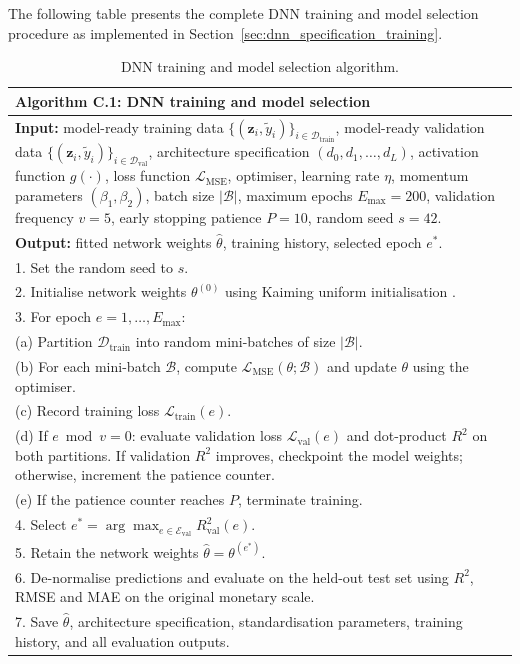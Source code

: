 The following table presents the complete DNN training and model
selection procedure as implemented in
Section~\ref{sec:dnn_specification_training}.

\begin{table}[H]
\centering
{\small
\renewcommand{\arraystretch}{1.15}
\begin{tabular}{p{}}
\toprule
\textbf{Algorithm C.1: DNN training and model selection} \\
\midrule
\textbf{Input:} model-ready training data
$\{(\mathbf{z}_i, \widetilde{y}_i)\}_{i \in \mathcal{D}_{\mathrm{train}}}$,
model-ready validation data
$\{(\mathbf{z}_i, \widetilde{y}_i)\}_{i \in \mathcal{D}_{\mathrm{val}}}$,
architecture specification $(d_0, d_1, \ldots, d_L)$,
activation function $g(\cdot)$, loss function $\mathcal{L}_{\mathrm{MSE}}$,
optimiser, learning rate $\eta$, momentum parameters $(\beta_1,\beta_2)$,
batch size $|\mathcal{B}|$,
maximum epochs $E_{\max} = 200$, validation frequency $v = 5$,
early stopping patience $P = 10$, random seed $s = 42$. \\[3pt]

\textbf{Output:} fitted network weights $\widehat{\theta}$,
training history, selected epoch $e^{*}$. \\[3pt]

1. Set the random seed to $s$. \\
2. Initialise network weights $\theta^{(0)}$ using Kaiming uniform
   initialisation \citep{he2015delving}. \\
3. For epoch $e = 1, \ldots, E_{\max}$: \\
\quad (a) Partition $\mathcal{D}_{\mathrm{train}}$ into random
        mini-batches of size $|\mathcal{B}|$. \\
\quad (b) For each mini-batch $\mathcal{B}$, compute
        $\mathcal{L}_{\mathrm{MSE}}(\theta; \mathcal{B})$ and update
        $\theta$ using the optimiser. \\
\quad (c) Record training loss $\mathcal{L}_{\mathrm{train}}(e)$. \\
\quad (d) If $e \bmod v = 0$: evaluate validation loss
        $\mathcal{L}_{\mathrm{val}}(e)$ and dot-product $R^2$ on both
        partitions.  If validation $R^2$ improves, checkpoint the model
        weights; otherwise, increment the patience counter. \\
\quad (e) If the patience counter reaches $P$, terminate training. \\
4. Select $e^{*} = \arg\max_{e \in \mathcal{E}_{\mathrm{val}}}
   R^2_{\mathrm{val}}(e)$. \\
5. Retain the network weights $\widehat{\theta} = \theta^{(e^{*})}$. \\
6. De-normalise predictions and evaluate on the held-out test set using
   \ensuremath{R^2}, RMSE and MAE on the original monetary scale. \\
7. Save $\widehat{\theta}$, architecture specification, standardisation
   parameters, training history, and all evaluation outputs. \\
\bottomrule
\end{tabular}}
\caption{DNN training and model selection algorithm.}
\label{tab:dnn_training_algorithm_annex}
\end{table}

